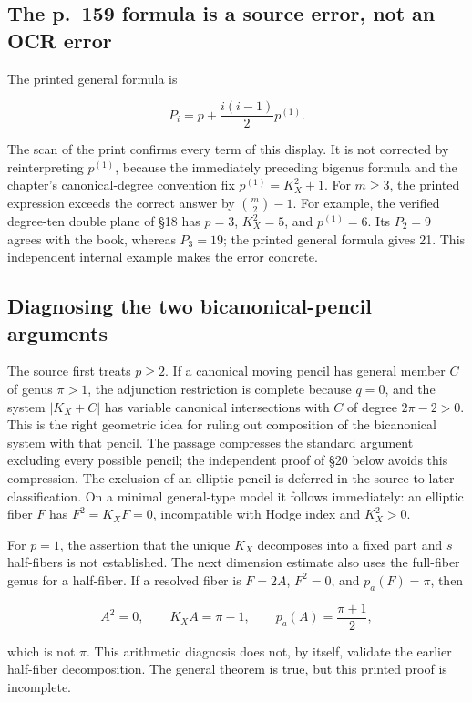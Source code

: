 \subsection{The p.~159 formula is a source error, not an OCR error}

The printed general formula is

\[
P_i=p+\frac{i(i-1)}2p^{(1)}.
\]

The scan of the print confirms every term of this display. It is not corrected by reinterpreting \(p^{(1)}\), because the immediately preceding bigenus formula and the chapter's canonical-degree convention fix \(p^{(1)}=K_X^2+1\). For \(m\ge 3\), the printed expression exceeds the correct answer by \(\binom m 2-1\). For example, the verified degree-ten double plane of §18 has \(p=3\), \(K_X^2=5\), and \(p^{(1)}=6\). Its \(P_2=9\) agrees with the book, whereas \(P_3=19\); the printed general formula gives 21. This independent internal example makes the error concrete.

\subsection{Diagnosing the two bicanonical-pencil arguments}

The source first treats \(p\ge 2\). If a canonical moving pencil has general member \(C\) of genus \(\pi>1\), the adjunction restriction is complete because \(q=0\), and the system \(|K_X+C|\) has variable canonical intersections with \(C\) of degree \(2\pi-2>0\). This is the right geometric idea for ruling out composition of the bicanonical system with that pencil. The passage compresses the standard argument excluding every possible pencil; the independent proof of §20 below avoids this compression. The exclusion of an elliptic pencil is deferred in the source to later classification. On a minimal general-type model it follows immediately: an elliptic fiber \(F\) has \(F^2=K_X F=0\), incompatible with Hodge index and \(K_X^2>0\).

For \(p=1\), the assertion that the unique \(K_X\) decomposes into a fixed part and \(s\) half-fibers is not established. The next dimension estimate also uses the full-fiber genus for a half-fiber. If a resolved fiber is \(F=2 A\), \(F^2=0\), and \(p_a(F)=\pi\), then

\[
A^2=0,\qquad K_X A=\pi-1,\qquad
p_a(A)=\frac{\pi+1}{2},
\]

which is not \(\pi\). This arithmetic diagnosis does not, by itself, validate the earlier half-fiber decomposition. The general theorem is true, but this printed proof is incomplete.

